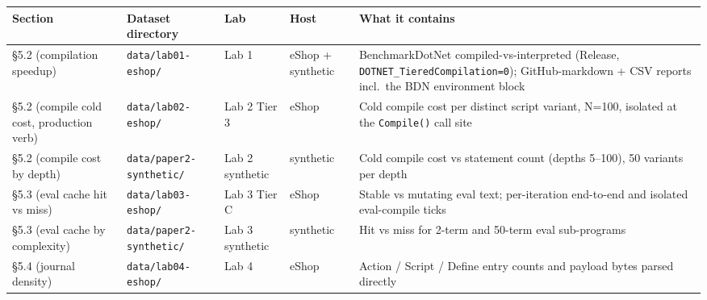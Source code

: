 \documentclass[
]{article}
\newcounter{none} %
\let\origtexttt\texttt%
\renewcommand{\texttt}[1]{\origtexttt{\seqsplit{#1}}}%
\let\texttt\origtexttt%
\begin{document}
{\def\LTcaptype{none} %
\begin{longtable}[]{@{}
  >{\raggedright\arraybackslash}p{}
  >{\raggedright\arraybackslash}p{}
  >{\raggedright\arraybackslash}p{}
  >{\raggedright\arraybackslash}p{}
  >{\raggedright\arraybackslash}p{}@{}}
\toprule\noalign{}
\begin{minipage}[b]{\linewidth}\raggedright
Section
\end{minipage} & \begin{minipage}[b]{\linewidth}\raggedright
Dataset directory
\end{minipage} & \begin{minipage}[b]{\linewidth}\raggedright
Lab
\end{minipage} & \begin{minipage}[b]{\linewidth}\raggedright
Host
\end{minipage} & \begin{minipage}[b]{\linewidth}\raggedright
What it contains
\end{minipage} \\
\midrule\noalign{}
\endhead
\bottomrule\noalign{}
\endlastfoot
§5.2 (compilation speedup) & \texttt{data/lab01-eshop/} & Lab 1 & eShop
+ synthetic & BenchmarkDotNet compiled-vs-interpreted (Release,
\texttt{DOTNET\_TieredCompilation=0}); GitHub-markdown + CSV reports
incl.~the BDN environment block \\
§5.2 (compile cold cost, production verb) & \texttt{data/lab02-eshop/} &
Lab 2 Tier 3 & eShop & Cold compile cost per distinct script variant,
N=100, isolated at the \texttt{Compile()} call site \\
§5.2 (compile cost by depth) & \texttt{data/paper2-synthetic/} & Lab 2
synthetic & synthetic & Cold compile cost vs statement count (depths
5--100), 50 variants per depth \\
§5.3 (eval cache hit vs miss) & \texttt{data/lab03-eshop/} & Lab 3 Tier
C & eShop & Stable vs mutating eval text; per-iteration end-to-end and
isolated eval-compile ticks \\
§5.3 (eval cache by complexity) & \texttt{data/paper2-synthetic/} & Lab
3 synthetic & synthetic & Hit vs miss for 2-term and 50-term eval
sub-programs \\
§5.4 (journal density) & \texttt{data/lab04-eshop/} & Lab 4 & eShop &
Action / Script / Define entry counts and payload bytes parsed directly

\end{longtable}}
\end{document}
